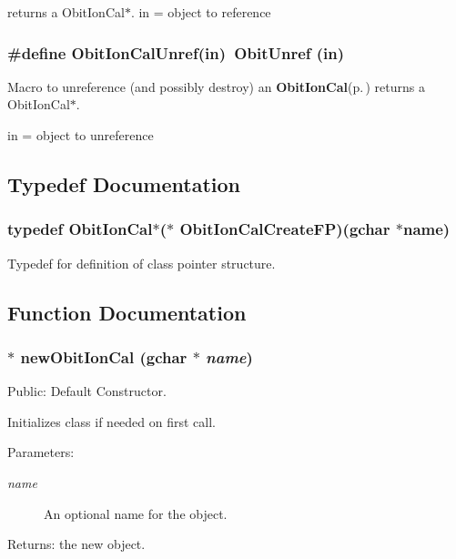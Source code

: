 returns a Obit\-Ion\-Cal$\ast$. in = object to reference 
\subsubsection{\setlength{\rightskip}{0pt plus 5cm}\#define Obit\-Ion\-Cal\-Unref(in)\ Obit\-Unref (in)}\label{ObitIonCal_8h_a0}


Macro to unreference (and possibly destroy) an {\bf Obit\-Ion\-Cal}{\rm (p.\,\pageref{structObitIonCal})} returns a Obit\-Ion\-Cal$\ast$. 

in = object to unreference 

\subsection{Typedef Documentation}
\subsubsection{\setlength{\rightskip}{0pt plus 5cm}typedef {\bf Obit\-Ion\-Cal}$\ast$($\ast$ {\bf Obit\-Ion\-Cal\-Create\-FP})(gchar $\ast$name)}\label{ObitIonCal_8h_a3}


Typedef for definition of class pointer structure. 



\subsection{Function Documentation}
\subsubsection{$\ast$ new\-Obit\-Ion\-Cal (gchar $\ast$ {\em name})}\label{ObitIonCal_8h_a5}


Public: Default Constructor. 

Initializes class if needed on first call. \begin{Desc}
\item[Parameters:]
\begin{description}
\item[{\em name}]An optional name for the object. \end{description}
\end{Desc}
\begin{Desc}
\item[Returns:]the new object. \end{Desc}
